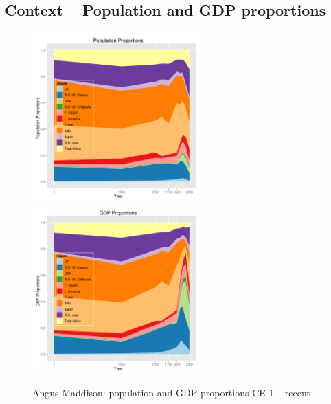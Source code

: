 \documentclass[final]{beamer}
\begin{document}
\subsection{Context -- Population and GDP proportions}	
\begin{frame}		
		\begin{figure}[h]
		\centerline{
		\mbox{\includegraphics[width=0.58\textwidth]{maddisonregpoppct.png}}
		\mbox{\includegraphics[width=0.58\textwidth]{maddisonreggdppct.png}}
		}
		\caption{Angus Maddison: population and GDP proportions CE 1 -- recent}
		\label{fig:poppct}
		\end{figure}	
\end{frame}
\end{document}
